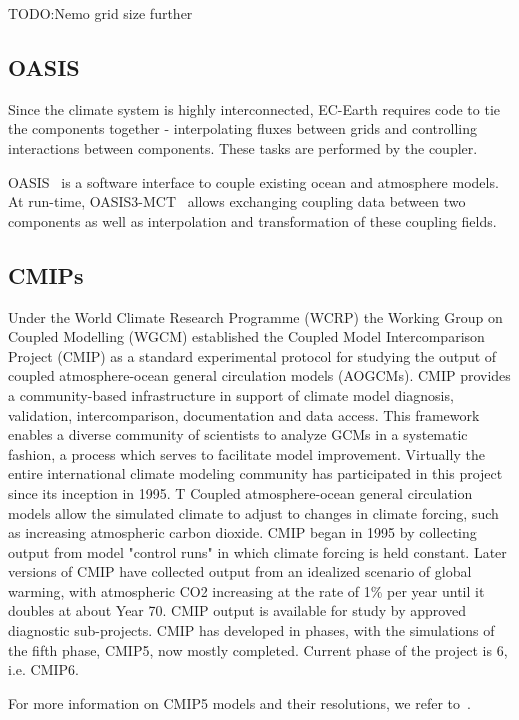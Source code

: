 TODO:Nemo grid size further

\subsection{OASIS}
Since the climate system is highly interconnected, EC-Earth requires code to tie the components together - interpolating fluxes between grids and controlling interactions between components. These tasks are performed by the coupler.

OASIS~\cite{gmd-6-373-2013} is a software interface to couple existing ocean and atmosphere models. At run-time, OASIS3-MCT~\cite{oasis3-mct} allows exchanging coupling data between two components as well as interpolation and transformation of these coupling fields. 



\subsection{CMIPs}
Under the World Climate Research Programme (WCRP) the Working Group on Coupled Modelling (WGCM) established the Coupled Model Intercomparison Project (CMIP) as a standard experimental protocol for studying the output of coupled atmosphere-ocean general circulation models (AOGCMs). CMIP provides a community-based infrastructure in support of climate model diagnosis, validation, intercomparison, documentation and data access. This framework enables a diverse community of scientists to analyze GCMs in a systematic fashion, a process which serves to facilitate model improvement. Virtually the entire international climate modeling community has participated in this project since its inception in 1995. T
Coupled atmosphere-ocean general circulation models allow the simulated climate to adjust to changes in climate forcing, such as increasing atmospheric carbon dioxide. CMIP began in 1995 by collecting output from model "control runs" in which climate forcing is held constant. Later versions of CMIP have collected output from an idealized scenario of global warming, with atmospheric CO2 increasing at the rate of 1\% per year until it doubles at about Year 70. CMIP output is available for study by approved diagnostic sub-projects. 
CMIP has developed in phases, with the simulations of the fifth phase, CMIP5, now mostly completed. Current phase of the project is 6, i.e. CMIP6. 

For more information on CMIP5 models and their resolutions, we refer to~\cite{cmip5}.

